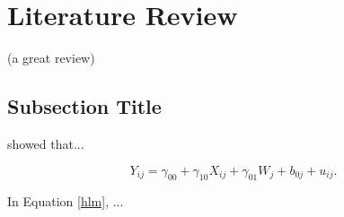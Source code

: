 \section{Literature Review}\label{review1}

(a great review)

\subsection{Subsection Title}

\textcite{hoffman_interpretation_2019} showed that...

\begin{equation}\label{hlm}
    Y_{ij} = \gamma_{00} + \gamma_{10}X_{ij} + \gamma_{01}W_j + b_{0j} + u_{ij}.
\end{equation}

In Equation \ref{hlm}, ...